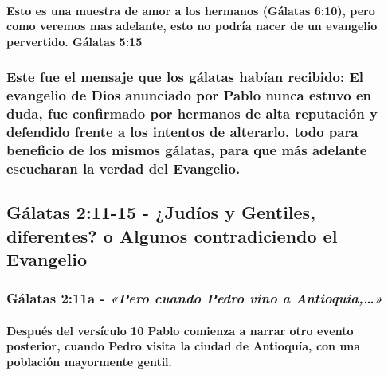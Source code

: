 \documentclass[11a pt,twoside]{article}
\newcommand{\scripture}[1]{%
  {\fontsize{12pt}{16pt}\selectfont\ScriptureFont\itshape #1}%
}
\def\textbf#1{#1}%
\let\oldsubsection\subsection
\renewcommand{\subsection}{\needspace{5\baselineskip}\oldsubsection}
\let\oldsubsubsection\subsubsection
\renewcommand{\subsubsection}{\needspace{4\baselineskip}\oldsubsubsection}
\let\oldparagraph\paragraph
\renewcommand{\paragraph}{\needspace{3\baselineskip}\oldparagraph}
\begin{document}
\paragraph{Esto es una muestra de amor a los hermanos (Gálatas 6:10),
pero como veremos mas adelante, esto no podría nacer de un evangelio
pervertido. Gálatas
5:15}\label{esto-es-una-muestra-de-amor-a-los-hermanos-guxe1latas-610-pero-como-veremos-mas-adelante-esto-no-podruxeda-nacer-de-un-evangelio-pervertido.-guxe1latas-515}

\subsubsection{\texorpdfstring{\textbf{Este fue el mensaje que los
gálatas habían recibido:} El evangelio de Dios anunciado por Pablo nunca
estuvo en duda, fue confirmado por hermanos de alta reputación y
defendido frente a los intentos de alterarlo, todo para beneficio de los
mismos gálatas, para que más adelante escucharan la verdad del
Evangelio.}{Este fue el mensaje que los gálatas habían recibido: El evangelio de Dios anunciado por Pablo nunca estuvo en duda, fue confirmado por hermanos de alta reputación y defendido frente a los intentos de alterarlo, todo para beneficio de los mismos gálatas, para que más adelante escucharan la verdad del Evangelio.}}\label{este-fue-el-mensaje-que-los-guxe1latas-habuxedan-recibido-el-evangelio-de-dios-anunciado-por-pablo-nunca-estuvo-en-duda-fue-confirmado-por-hermanos-de-alta-reputaciuxf3n-y-defendido-frente-a-los-intentos-de-alterarlo-todo-para-beneficio-de-los-mismos-guxe1latas-para-que-muxe1s-adelante-escucharan-la-verdad-del-evangelio.}

\subsection{Gálatas 2:11-15 - ¿Judíos y Gentiles, diferentes? o Algunos
contradiciendo el
Evangelio}\label{guxe1latas-211-15---juduxedos-y-gentiles-diferentes-o-algunos-contradiciendo-el-evangelio}

\subsubsection{\texorpdfstring{Gálatas 2:11a -
\scripture{«Pero cuando Pedro vino a Antioquía,…»}}{Gálatas 2:11a - }}\label{guxe1latas-211a---pero-cuando-pedro-vino-a-antioquuxeda}

\paragraph{Después del versículo 10 Pablo comienza a narrar otro evento
posterior, cuando Pedro visita la ciudad de Antioquía, con una población
mayormente
gentil.}\label{despuuxe9s-del-versuxedculo-10-pablo-comienza-a-narrar-otro-evento-posterior-cuando-pedro-visita-la-ciudad-de-antioquuxeda-con-una-poblaciuxf3n-mayormente-gentil.}
\end{document}
